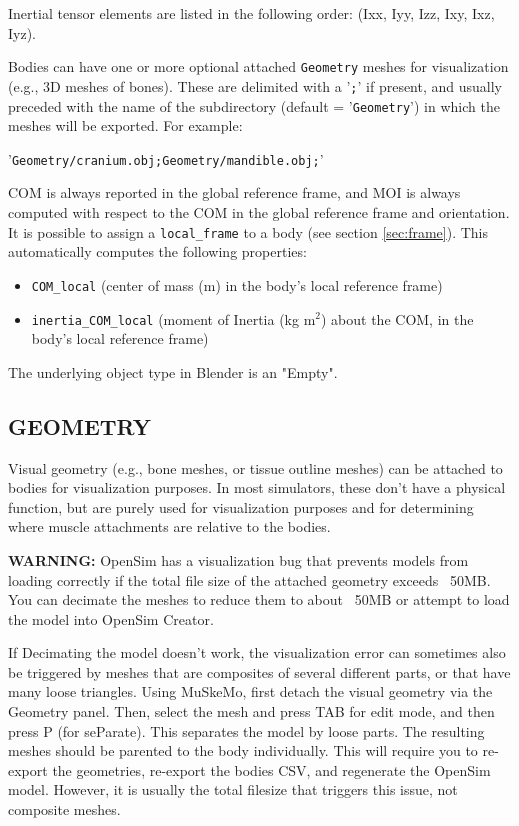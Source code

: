 \documentclass{article}
\begin{document}
Inertial tensor elements are listed in the following order: (Ixx, Iyy, Izz, Ixy, Ixz, Iyz).

Bodies can have one or more optional attached \texttt{Geometry} meshes for visualization (e.g., 3D meshes of bones). These are delimited with a '\texttt{;}' if present, and usually preceded with the name of the subdirectory (default = '\texttt{Geometry}') in which the meshes will be exported. For example: 

'\texttt{Geometry/cranium.obj;Geometry/mandible.obj;}'

COM is always reported in the global reference frame, and MOI is always computed with respect to the COM in the global reference frame and orientation. It is possible to assign a \texttt{local\_frame} to a body (see section \ref{sec:frame}). This automatically computes the following properties:


\begin{itemize}
    \item \texttt{COM\_local} (center of mass (m) in the body's local reference frame)
    \item \texttt{inertia\_COM\_local} (moment of Inertia (kg m\(^2\)) about the COM, in the body's local reference frame)
\end{itemize}

The underlying object type in Blender is an "Empty".

\subsection{GEOMETRY}
\label{sec:geometry}

Visual geometry (e.g., bone meshes, or tissue outline meshes) can be attached to bodies for visualization purposes. In most simulators, these don’t have a physical function, but are purely used for visualization purposes and for determining where muscle attachments are relative to the bodies. 

\textbf{WARNING:} OpenSim has a visualization bug that prevents models from loading correctly if the total file size of the attached geometry exceeds ~50MB. You can decimate the meshes to reduce them to about ~50MB or attempt to load the model into OpenSim Creator.

If Decimating the model doesn't work, the visualization error can sometimes also be triggered by meshes that are composites of several different parts, or that have many loose triangles. Using MuSkeMo, first detach the visual geometry via the Geometry panel. Then, select the mesh and press TAB for edit mode, and then press P (for seParate). This separates the model by loose parts. The resulting meshes should be  parented to the body individually. 
This will require you to re-export the geometries, re-export the bodies CSV, and regenerate the OpenSim model. However, it is usually the total filesize that triggers this issue, not composite meshes.
\end{document}
